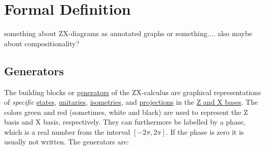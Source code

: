 \documentclass[a4paper, 12pt]{article}
\begin{document}
\section{Formal Definition}

something about ZX-diagrams as annotated graphs or something....
also maybe about compositionality?

\subsection{Generators}

The building blocks or \underline{generators} of the ZX-calculus are graphical
representations of \emph{specific} \underline{states}, \underline{unitaries},
\underline{isometries}, and \underline{projections} in the \underline{Z and X
  bases}.
The colors green and red (sometimes, white and black) are used to represent the
Z basis and X basis, respectively.
They can furthermore be labelled by a phase, which is a real number from the
interval $[-2\pi, 2\pi]$.
If the phase is zero it is usually not written.
The generators are:
\end{document}
